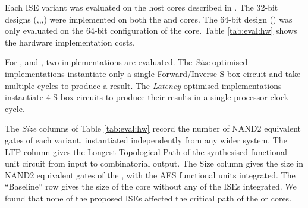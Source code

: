 
Each ISE variant was evaluated on the host cores
described in .
The 32-bit designs 
(,,,) were implemented on both the
 and  cores.
The 64-bit design () was only evaluated on the 64-bit configuration
of the  core.
Table \ref{tab:eval:hw} shows the hardware implementation costs.

For ,  and , two implementations are evaluated.
The {\em Size} optimised implementations instantiate only a single
Forward/Inverse S-box circuit and take multiple cycles
to produce a result.
The {\em Latency} optimised implementations instantiate $4$ S-box
 circuits to produce their results in a single processor 
clock cycle.

The {\em Size} columns of Table \ref{tab:eval:hw} 
record the number of NAND2 equivalent gates of each variant,
instantiated independently from any wider system.
The LTP column gives the Longest Topological Path of the synthesised
functional unit circuit from input to combinatorial output.
The  Size column gives the size in NAND2 equivalent gates of the
, with the AES functional units integrated.
The ``Baseline'' row gives the size of the core without any of the
ISEs integrated.
We found that none of the proposed ISEs affected the critical
path of the  or  cores.



